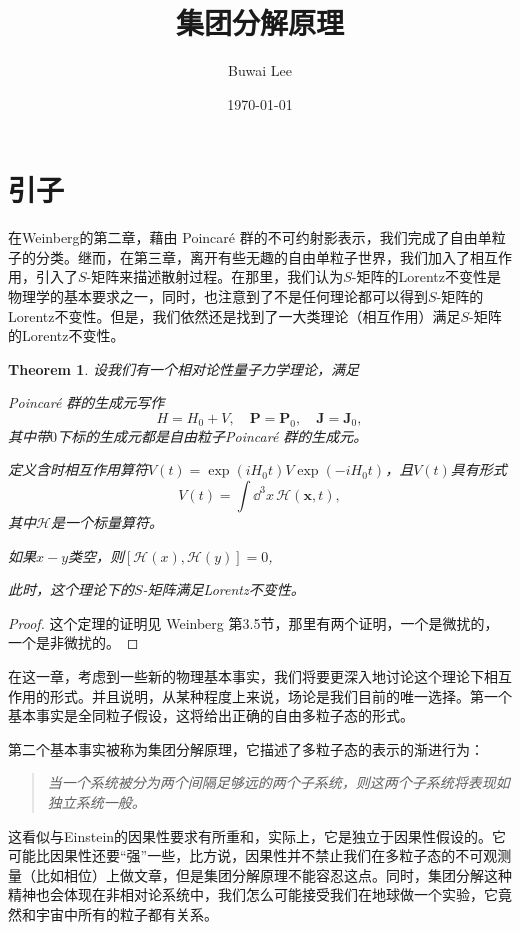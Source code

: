 \documentclass[11pt]{article}
\title{集团分解原理}
\date{\today}
\author{Buwai Lee}
\theoremstyle{definition}
\theoremstyle{plain}
\newtheorem{thm}[para]{Theorem}
\begin{document}
\maketitle
\tableofcontents

\section{引子}

在Weinberg的第二章，藉由 Poincar\'{e} 群的不可约射影表示，我们完成了自由单粒子的分类。继而，在第三章，离开有些无趣的自由单粒子世界，我们加入了相互作用，引入了$S$-矩阵来描述散射过程。在那里，我们认为$S$-矩阵的Lorentz不变性是物理学的基本要求之一，同时，也注意到了不是任何理论都可以得到$S$-矩阵的Lorentz不变性。但是，我们依然还是找到了一大类理论（相互作用）满足$S$-矩阵的Lorentz不变性。

\begin{thm}
设我们有一个相对论性量子力学理论，满足
\begin{compactenum}
\item Poincar\'{e} 群的生成元写作
\[
	H=H_0+V,\quad \bm{P}= \bm{P}_0,\quad \bm{J}= \bm{J}_0,
\]
其中带$0$下标的生成元都是自由粒子Poincar\'{e} 群的生成元。
\item 定义含时相互作用算符$V(t)=\exp(iH_0 t)V\exp(-iH_0 t)$，且$V(t)$具有形式
\[
	V(t)=\int \dd^3 x\, \mathscr{H}(\bm{x},t),
\]
其中$\mathscr{H}$是一个标量算符。
\item 如果$x-y$类空，则$[\mathscr{H}(x),\mathscr{H}(y)]=0$,
\end{compactenum}
此时，这个理论下的$S$-矩阵满足Lorentz不变性。
\end{thm}

\begin{proof}
这个定理的证明见 Weinberg 第3.5节，那里有两个证明，一个是微扰的，一个是非微扰的。
\end{proof}

在这一章，考虑到一些新的物理基本事实，我们将要更深入地讨论这个理论下相互作用的形式。并且说明，从某种程度上来说，场论是我们目前的唯一选择。第一个基本事实是全同粒子假设，这将给出正确的自由多粒子态的形式。

第二个基本事实被称为集团分解原理，它描述了多粒子态的表示的渐进行为：
\begin{quote}\it
	当一个系统被分为两个间隔足够远的两个子系统，则这两个子系统将表现如独立系统一般。
\end{quote}
这看似与Einstein的因果性要求有所重和，实际上，它是独立于因果性假设的。它可能比因果性还要“强”一些，比方说，因果性并不禁止我们在多粒子态的不可观测量（比如相位）上做文章，但是集团分解原理不能容忍这点。同时，集团分解这种精神也会体现在非相对论系统中，我们怎么可能接受我们在地球做一个实验，它竟然和宇宙中所有的粒子都有关系。
\end{document}
